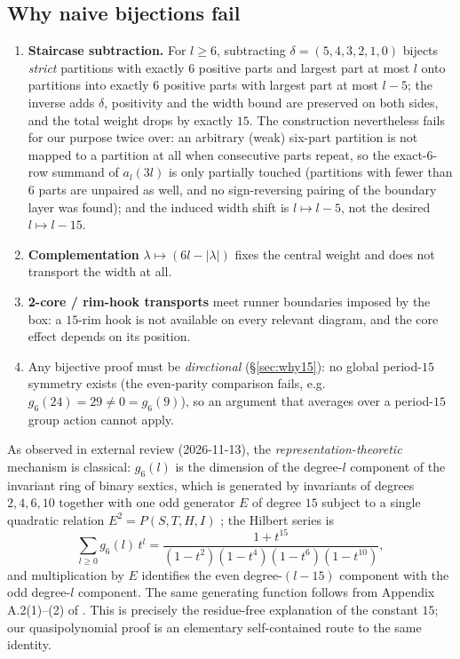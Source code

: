 \documentclass[11pt,reqno]{article}
\theoremstyle{definition}
\begin{document}
\subsection{Why naive bijections fail}\label{sec:naive}
\begin{enumerate}
\item \textbf{Staircase subtraction.} For $l\ge6$, subtracting $\delta=(5,4,3,2,1,0)$ bijects \emph{strict} partitions with exactly $6$ positive parts and largest part at most $l$ onto partitions into exactly $6$ positive parts with largest part at most $l-5$; the inverse adds $\delta$, positivity and the width bound are preserved on both sides, and the total weight drops by exactly $15$. The construction nevertheless fails for our purpose twice over: an arbitrary (weak) six-part partition is not mapped to a partition at all when consecutive parts repeat, so the exact-$6$-row summand of $a_l(3l)$ is only partially touched (partitions with fewer than $6$ parts are unpaired as well, and no sign-reversing pairing of the boundary layer was found); and the induced width shift is $l\mapsto l-5$, not the desired $l\mapsto l-15$.
\item \textbf{Complementation} $\lambda\mapsto(6l-|\lambda|)$ fixes the central weight and does not transport the width at all.
\item \textbf{2-core / rim-hook transports} meet runner boundaries imposed by the box: a $15$-rim hook is not available on every relevant diagram, and the core effect depends on its position.
\item Any bijective proof must be \emph{directional} (\S\ref{sec:why15}): no global period-$15$ symmetry exists (the even-parity comparison fails, e.g.\ $g_6(24)=29\ne0=g_6(9)$), so an argument that averages over a period-$15$ group action cannot apply.
\end{enumerate}

As observed in external review (2026-11-13), the \emph{representation-theoretic} mechanism is classical: $g_6(l)$ is the dimension of the degree-$l$ component of the invariant ring of binary sextics, which is generated by invariants of degrees $2,4,6,10$ together with one odd generator $E$ of degree $15$ subject to a single quadratic relation $E^2=P(S,T,H,I)$ \cite{GY}; the Hilbert series is
\[
\sum_{l\ge0} g_6(l)\,t^l=\frac{1+t^{15}}{(1-t^2)(1-t^4)(1-t^6)(1-t^{10})},
\]
and multiplication by $E$ identifies the even degree-$(l-15)$ component with the odd degree-$l$ component. The same generating function follows from Appendix A.2(1)--(2) of \cite{KKM}. This is precisely the residue-free explanation of the constant $15$; our quasipolynomial proof is an elementary self-contained route to the same identity.
\end{document}
